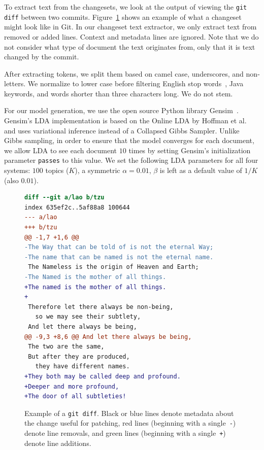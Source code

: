 To extract text from the changesets, we look at the output of viewing
the \texttt{git diff} between two commits.
Figure~\ref{fig:diff} shows an example of what a changeset might look
like in Git.
In our changeset text extractor, we only extract text from removed or added lines.
Context and metadata lines are ignored.
Note that we do not consider what type of document the text originates from,
only that it is text changed by the commit.

After extracting tokens, we split them based on camel case, underscores, and non-letters.
We normalize to lower case before filtering English stop words~\cite{StopWords}, Java keywords, and words shorter than three characters long.
We do not stem.


For our model generation, we use the open source Python library Gensim~\cite{Gensim}.
Gensim's LDA implementation is based on the Online LDA by Hoffman et al.~\cite{Hoffman-etal:2010}
and uses variational inference instead of a Collapsed Gibbs Sampler.
Unlike Gibbs sampling, in order to ensure that the model converges for each document,
we allow LDA to see each document $10$ times by setting Gensim's initialization parameter \texttt{passes} to this value.
We set the following LDA parameters for all four systems:
$100$ topics ($K$),
a symmetric $\alpha=0.01$,
$\beta$ is left as a default value of $1/K$ (also $0.01$).


\begin{figure}[ht]
\centering
\footnotesize
\begin{lstlisting}[language=diff, basicstyle=\ttfamily]
diff --git a/lao b/tzu
index 635ef2c..5af88a8 100644
--- a/lao
+++ b/tzu
@@ -1,7 +1,6 @@
-The Way that can be told of is not the eternal Way;
-The name that can be named is not the eternal name.
 The Nameless is the origin of Heaven and Earth;
-The Named is the mother of all things.
+The named is the mother of all things.
+
 Therefore let there always be non-being,
   so we may see their subtlety,
 And let there always be being,
@@ -9,3 +8,6 @@ And let there always be being,
 The two are the same,
 But after they are produced,
   they have different names.
+They both may be called deep and profound.
+Deeper and more profound,
+The door of all subtleties!
\end{lstlisting}
\caption{Example of a \texttt{git diff}. Black or blue lines denote metadata about the change useful for patching, red lines (beginning with a single~\texttt{-}) denote line removals, and green lines (beginning with a single~\texttt{+}) denote line additions.}
\label{fig:diff}
\end{figure}

